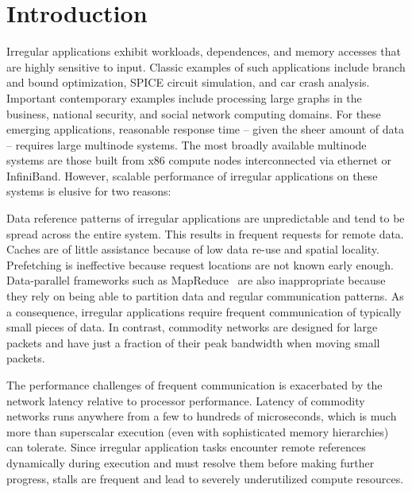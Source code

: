 \section{Introduction} \label{sec:intro}

Irregular applications exhibit workloads, dependences, and memory accesses
that are highly sensitive to input. Classic examples of such applications
include branch and bound optimization, SPICE circuit simulation, and car crash
analysis. Important contemporary examples include processing large graphs in
the business, national security, and social network computing domains. For
these emerging applications, reasonable response time -- given the sheer
amount of data -- requires large multinode systems. The most broadly available
multinode systems are those built from x86 compute nodes interconnected via
ethernet or InfiniBand. However, scalable performance of irregular
applications on these systems is elusive for two reasons:

\vspace{0.5ex}
 Data reference
patterns of irregular applications are unpredictable and tend to be spread
across the entire system. This results in frequent requests for remote data.
Caches are of little assistance because of low data re-use and spatial
locality. Prefetching is ineffective because request locations are not known
early enough. Data-parallel frameworks such as
MapReduce~\cite{mapreduce:osdi04} are also inappropriate because they rely on
being able to partition data and regular communication patterns. As a
consequence, irregular applications require frequent communication of
typically small pieces of data. In contrast, commodity networks are designed
for large packets and have just a fraction of their peak bandwidth when moving
small packets.

\vspace{0.5ex}  The
performance challenges of frequent communication is exacerbated by the network
latency relative to processor performance. Latency of commodity networks runs
anywhere from a few to hundreds of microseconds, which is much more than
superscalar execution (even with sophisticated memory hierarchies) can
tolerate. Since irregular application tasks encounter remote references
dynamically during execution and must resolve them before making further
progress, stalls are frequent and lead to severely underutilized compute
resources.

